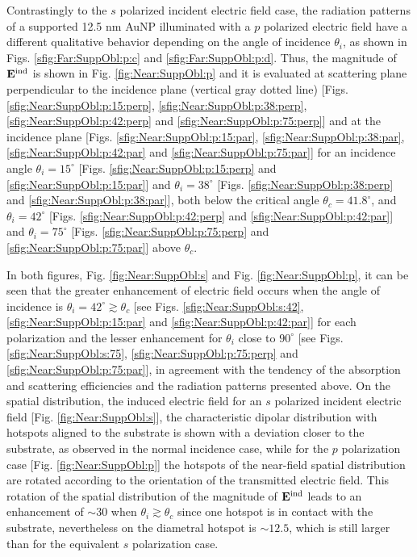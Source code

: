 Contrastingly to the $s$ polarized incident electric field case, the radiation patterns of a supported 12.5 nm AuNP illuminated with a $p$ polarized electric field have a different qualitative behavior depending on the angle of incidence $\theta_i$, as shown in Figs. \ref{sfig:Far:SuppObl:p:c} and  \ref{sfig:Far:SuppObl:p:d}. Thus, the magnitude of $\vb{E}^\text{ind}$ is shown in Fig. \ref{fig:Near:SuppObl:p} and it is evaluated at scattering plane perpendicular to the incidence plane (vertical gray dotted line) [Figs. \ref{sfig:Near:SuppObl:p:15:perp}, \ref{sfig:Near:SuppObl:p:38:perp}, \ref{sfig:Near:SuppObl:p:42:perp} and \ref{sfig:Near:SuppObl:p:75:perp}] and at the incidence  plane [Figs. \ref{sfig:Near:SuppObl:p:15:par}, \ref{sfig:Near:SuppObl:p:38:par}, \ref{sfig:Near:SuppObl:p:42:par} and \ref{sfig:Near:SuppObl:p:75:par}] for an incidence angle $\theta_i = 15^\circ$ [Figs. \ref{sfig:Near:SuppObl:p:15:perp}  and \ref{sfig:Near:SuppObl:p:15:par}] and  $\theta_i = 38^\circ$ [Figs. \ref{sfig:Near:SuppObl:p:38:perp}  and \ref{sfig:Near:SuppObl:p:38:par}], both below the critical angle $\theta_c = 41.8^\circ$, and $\theta_i = 42^\circ$ [Figs. \ref{sfig:Near:SuppObl:p:42:perp}  and \ref{sfig:Near:SuppObl:p:42:par}] and  $\theta_i = 75^\circ$ [Figs. \ref{sfig:Near:SuppObl:p:75:perp}  and \ref{sfig:Near:SuppObl:p:75:par}] above $\theta_c$.

In both figures, Fig. \ref{fig:Near:SuppObl:s} and Fig. \ref{fig:Near:SuppObl:p}, it can be seen that the greater enhancement of electric field occurs when the angle of incidence is $\theta_i = 42^ \circ \gtrsim \theta_c$ [see Figs. \ref{sfig:Near:SuppObl:s:42}, \ref{sfig:Near:SuppObl:p:15:par} and \ref{sfig:Near:SuppObl:p:42:par}] for each polarization and the lesser enhancement for $\theta_i$ close to $90^\circ$ [see Figs. \ref{sfig:Near:SuppObl:s:75}, \ref{sfig:Near:SuppObl:p:75:perp} and \ref{sfig:Near:SuppObl:p:75:par}], in agreement with the tendency of the absorption and scattering efficiencies and the radiation patterns presented above. On the spatial distribution, the induced electric field for an $s$ polarized incident electric field [Fig. \ref{fig:Near:SuppObl:s}], the characteristic dipolar distribution with hotspots aligned to the substrate is shown with a deviation closer to the substrate, as observed in the normal incidence case, while for the $p$ polarization case [Fig. \ref{fig:Near:SuppObl:p}] the hotspots of the near-field spatial distribution are rotated according to the orientation of the transmitted electric field. This rotation of the spatial distribution of the magnitude of $\vb{E}^\text{ind}$ leads to an enhancement of $\sim 30$ when $\theta_i \gtrsim \theta_c$ since one hotspot is in contact with the substrate, nevertheless on the diametral hotspot is $\sim 12.5$, which is still larger than for the equivalent $s$ polarization case.

